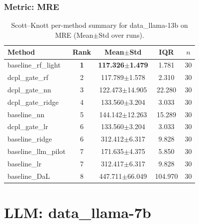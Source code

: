 \subsubsection*{Metric: MRE}
\begin{table}[H]
\centering
\scriptsize
\setlength{\tabcolsep}{4pt}
\renewcommand{\arraystretch}{1.1}
\caption{Scott--Knott per-method summary for data\_llama-13b on MRE (Mean$\pm$Std over runs).}
\label{tab:sk_data_llama-13b_MRE}
\begin{tabular}{l|c|c|c|c}
\hline
\textbf{Method} & \textbf{Rank} & \textbf{Mean$\pm$Std} & \textbf{IQR} & \textbf{$n$} \\
\hline
\rowcolor{red!15} baseline\_rf\_light & \textbf{1} & \textbf{117.326$\pm$1.479} & 1.781 & 30 \\
dcpl\_gate\_rf & 2 & 117.789$\pm$1.578 & 2.310 & 30 \\
dcpl\_gate\_nn & 3 & 122.473$\pm$14.905 & 22.280 & 30 \\
dcpl\_gate\_ridge & 4 & 133.560$\pm$3.204 & 3.033 & 30 \\
baseline\_nn & 5 & 144.142$\pm$12.263 & 15.289 & 30 \\
dcpl\_gate\_lr & 6 & 133.560$\pm$3.204 & 3.033 & 30 \\
baseline\_ridge & 6 & 312.412$\pm$6.317 & 9.828 & 30 \\
baseline\_llm\_pilot & 7 & 171.635$\pm$4.375 & 5.850 & 30 \\
baseline\_lr & 7 & 312.417$\pm$6.317 & 9.828 & 30 \\
baseline\_DaL & 8 & 447.711$\pm$66.049 & 104.970 & 30 \\
\hline
\end{tabular}
\end{table}


\newpage

\section*{LLM: data\_llama-7b}

